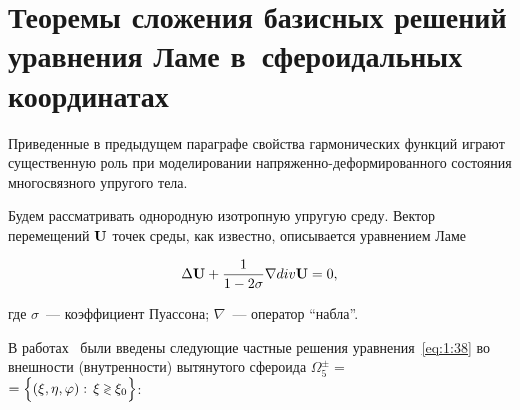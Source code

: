 %
%

\section[Теоремы сложения базисных решений уравнения Ламе в сфероидальных координатах]{Теоремы сложения базисных решений уравнения Ламе в~сфероидальных координатах
}

Приведенные в предыдущем параграфе свойства гармонических функций играют существенную роль при моделировании на\-пря\-жен\-но-де\-фор\-ми\-ро\-ван\-но\-го состояния многосвязного упругого тела.

Будем рассматривать однородную изотропную упругую среду. Вектор перемещений ${\bf{U}}$ точек среды, как известно, описывается уравнением Ламе

\begin{equation}\label{eq:1:38}
\Delta {\bf{U}} + \frac{1}{{1 - 2\sigma }}\nabla div{\bf{U}} = 0,
\end{equation}

\noindent где $\sigma$~--- коэффициент Пуассона; $\nabla$~--- оператор ``набла''.

В работах~\cite{Nikolaev1993,Nikolaev1984} были введены следующие частные решения уравнения~\eqref{eq:1:38} во внешности (внутренности) вытянутого сфероида $\Omega _5^ \pm = $ \\ $= \Big\{ {(\xi ,\eta ,\varphi ): \- {\mkern 1mu} {\kern 1pt} \xi  \mathbin{\lower.3ex\hbox{$\buildrel>\over
{\smash{\scriptstyle<}\vphantom{_x}}$}} {\xi _0}} \Big\}$:

